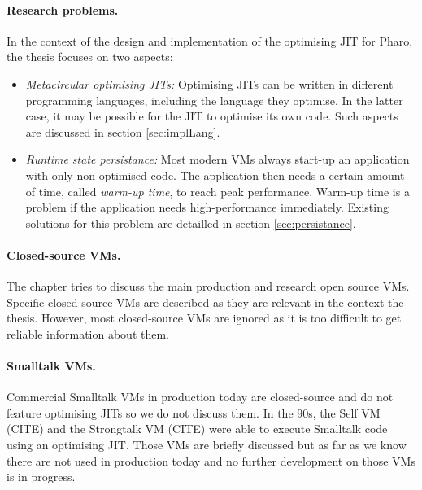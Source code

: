 \documentclass[a4paper,12pt,twoside]{../includes/ThesisStyle}
\begin{document}
\paragraph{Research problems.} In the context of the design and implementation of the optimising JIT for Pharo, the thesis focuses on 
two
aspects:
\begin{itemize}
	\item \emph{Metacircular optimising JITs: } Optimising JITs can be written in different programming languages, including the language they optimise. In the latter case, it may be possible for the JIT to optimise its own code. Such aspects are discussed in section \ref{sec:implLang}.
	\item \emph{Runtime state persistance:} Most modern VMs always start-up an application with only non optimised code. The application then needs a certain amount of time, called \emph{warm-up time}, to reach peak performance. Warm-up time is a problem if the application needs high-performance immediately. Existing solutions for this problem are detailled in section \ref{sec:persistance}.
\end{itemize}

\paragraph{Closed-source VMs.} The chapter tries to discuss the main production and research open source VMs. Specific closed-source VMs are described as they are relevant in the context the thesis. However, most closed-source VMs are ignored as it is too difficult to get reliable information about them. 

\paragraph{Smalltalk VMs.} Commercial Smalltalk VMs in production today are closed-source and do not feature optimising JITs so we do not discuss them. In the 90s, the Self VM (CITE) and the Strongtalk VM (CITE) were able to execute Smalltalk code using an optimising JIT. Those VMs are briefly discussed but as far as we know there are not used in production today and no further development on those VMs is in progress.
\end{document}
